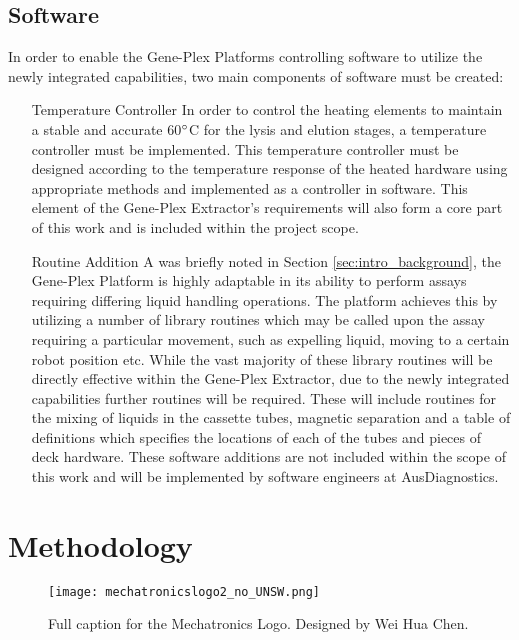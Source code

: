 \subsection{Software}
\label{sec:intro_software}
In order to enable the Gene-Plex Platforms controlling software to utilize the newly integrated capabilities, two main components of software must be created:
\begin{enumerate}
	\item[Temperature Controller] In order to control the heating elements to maintain a stable and accurate 60$\degree$C for the lysis and elution stages, a temperature controller must be implemented. This temperature controller must be designed according to the temperature response of the heated hardware using appropriate methods and implemented as a controller in software. This element of the Gene-Plex Extractor's requirements will also form a core part of this work and is included within the project scope.
	\item [Routine Addition] A was briefly noted in Section \ref{sec:intro_background}, the Gene-Plex Platform is highly adaptable in its ability to perform assays requiring differing liquid handling operations. The platform achieves this by utilizing a number of library routines which may be called upon the assay requiring a particular movement, such as expelling liquid, moving to a certain robot position etc. While the vast majority of these library routines will be directly effective within the Gene-Plex Extractor, due to the newly integrated capabilities further routines will be required. These will include routines for the mixing of liquids in the cassette tubes, magnetic separation and a table of definitions which specifies the locations of each of the tubes and pieces of deck hardware. These software additions are not included within the scope of this work and will be implemented by software engineers at AusDiagnostics.
\end{enumerate}


\section{Methodology}
\label{sec:intro_method}




\begin{figure}
\centering
\texttt{[image: mechatronicslogo2\_no\_UNSW.png]}
\caption[Short caption for list of figures.]{Full caption for the Mechatronics Logo. Designed by Wei Hua Chen.}
\label{fig:intro_logo}
\end{figure}

